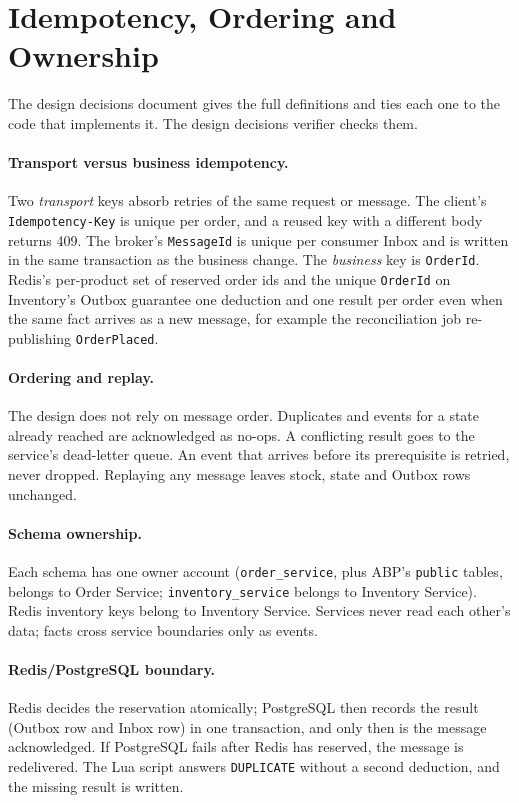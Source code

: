 \documentclass[a4paper]{report}
\begin{document}
\section{Idempotency, Ordering and Ownership}
\label{sec:design-decisions}
The design decisions document gives the full definitions and ties each one to
the code that implements it. The design decisions verifier checks them.

\paragraph{Transport versus business idempotency.} Two \emph{transport} keys
absorb retries of the same request or message. The client's
\texttt{Idempotency-Key} is unique per order, and a reused key with a different
body returns 409. The broker's \texttt{MessageId} is unique per consumer
Inbox and is written in the same transaction as the business change. The
\emph{business} key is \texttt{OrderId}. Redis's per-product set of reserved
order ids and the unique \texttt{OrderId} on Inventory's Outbox guarantee one
deduction and one result per order even when the same fact arrives as a new
message, for example the reconciliation job re-publishing \texttt{OrderPlaced}.

\paragraph{Ordering and replay.} The design does not rely on message order.
Duplicates and events for a state already reached are acknowledged as no-ops.
A conflicting result goes to the service's dead-letter queue. An event that
arrives before its prerequisite is retried, never dropped. Replaying any
message leaves stock, state and Outbox rows unchanged.

\paragraph{Schema ownership.} Each schema has one owner account
(\texttt{order\_service}, plus ABP's \texttt{public} tables, belongs to Order
Service; \texttt{inventory\_service} belongs to Inventory Service). Redis
inventory keys belong to Inventory Service. Services never read each other's
data; facts cross service boundaries only as events.

\paragraph{Redis/PostgreSQL boundary.} Redis decides the reservation
atomically; PostgreSQL then records the result (Outbox row and Inbox row) in
one transaction, and only then is the message acknowledged. If PostgreSQL fails
after Redis has reserved, the message is redelivered. The Lua script answers
\texttt{DUPLICATE} without a second deduction, and the missing result is
written.
\end{document}
